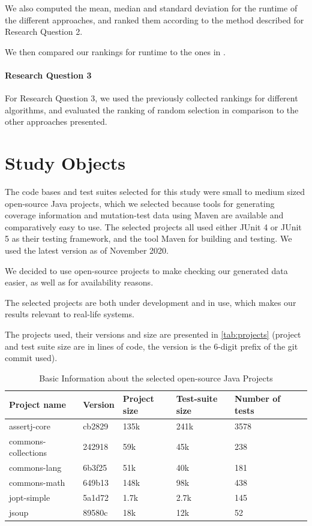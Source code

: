 We also computed the mean, median and standard deviation for the runtime
of the different approaches, and ranked them according to the method
described for Research Question 2.

We then compared our rankings for runtime to the ones in
\cite{cruciani2019scalable}.

\paragraph{Research Question 3}

For Research Question 3, we used the previously collected rankings
for different algorithms, and evaluated the ranking of random selection
in comparison to the other approaches presented.

\section{Study Objects}

The code bases and test suites selected for this study were small to
medium sized open-source Java projects, which we selected because tools
for generating coverage information and mutation-test data using Maven are
available and comparatively easy to use. The selected projects all used
either JUnit 4 or JUnit 5 as their testing framework, and the tool Maven
for building and testing. We used the latest version as of November 2020.

We decided to use open-source projects to make checking our generated
data easier, as well as for availability reasons.

The selected projects are both under development and in use, which makes
our results relevant to real-life systems.

The projects used, their versions and size are presented in
\autoref{tab:projects} (project and test suite size are in lines of code,
the version is the 6-digit prefix of the git commit used).

\begin{table}[htpb]
	\caption[Information about Projects Selected]{Basic Information about the selected open-source Java Projects}\label{tab:projects}
	\centering
	\begin{tabular}{l l l l l l}
		\toprule
		Project name & Version & Project size & Test-suite size & Number of tests \\
		\midrule
		assertj-core & cb2829 & 135k & 241k &3578 \\
		commons-collections & 242918 & 59k & 45k & 238 \\
		commons-lang & 6b3f25 & 51k & 40k & 181 \\
		commons-math & 649b13 & 148k & 98k & 438 \\
		jopt-simple & 5a1d72 & 1.7k & 2.7k & 145 \\
		jsoup & 89580c & 18k & 12k & 52 \\
		\bottomrule
	\end{tabular}
\end{table}

